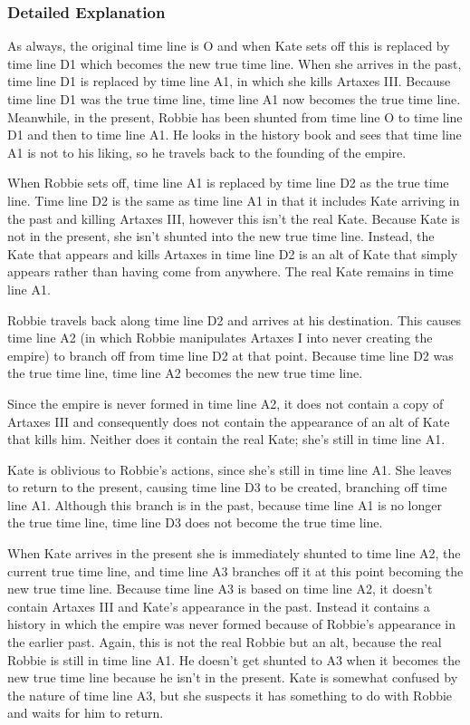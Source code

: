 \begin{multicols*}{2}
\subsubsection{Detailed Explanation}
As always, the original time line is O and when Kate sets off this is replaced by time line D1 which becomes the new true time line. When she arrives in the past, time line D1 is replaced by time line A1, in which she kills Artaxes III. Because time line D1 was the true time line, time line A1 now becomes the true time line. Meanwhile, in the present, Robbie has been shunted from time line O to time line D1 and then to time line A1. He looks in the history book and sees that time line A1 is not to his liking, so he travels back to the founding of the empire.

When Robbie sets off, time line A1 is replaced by time line D2 as the true time line. Time line D2 is the same as time line A1 in that it includes Kate arriving in the past and killing Artaxes III, however this isn’t the real Kate. Because Kate is not in the present, she isn’t shunted into the new true time line. Instead, the Kate that appears and kills Artaxes in time line D2 is an alt of Kate that simply appears rather than having come from anywhere. The real Kate remains in time line A1.

Robbie travels back along time line D2 and arrives at his destination. This causes time line A2 (in which Robbie manipulates Artaxes I into never creating the empire) to branch off from time line D2 at that point. Because time line D2 was the true time line, time line A2 becomes the new true time line.

Since the empire is never formed in time line A2, it does not contain a copy of Artaxes III and consequently does not contain the appearance of an alt of Kate that kills him. Neither does it contain the real Kate; she’s still in time line A1.

Kate is oblivious to Robbie’s actions, since she’s still in time line A1. She leaves to return to the present, causing time line D3 to be created, branching off time line A1. Although this branch is in the past, because time line A1 is no longer the true time line, time line D3 does not become the true time line.

When Kate arrives in the present she is immediately shunted to time line A2, the current true time line, and time line A3 branches off it at this point becoming the new true time line. Because time line A3 is based on time line A2, it doesn’t contain Artaxes III and Kate’s appearance in the past. Instead it contains a history in which the empire was never formed because of Robbie’s appearance in the earlier past. Again, this is not the real Robbie but an alt, because the real Robbie is still in time line A1. He doesn’t get shunted to A3 when it becomes the new true time line because he isn’t in the present. Kate is somewhat confused by the nature of time line A3, but she suspects it has something to do with Robbie and waits for him to return.


\end{multicols*}
